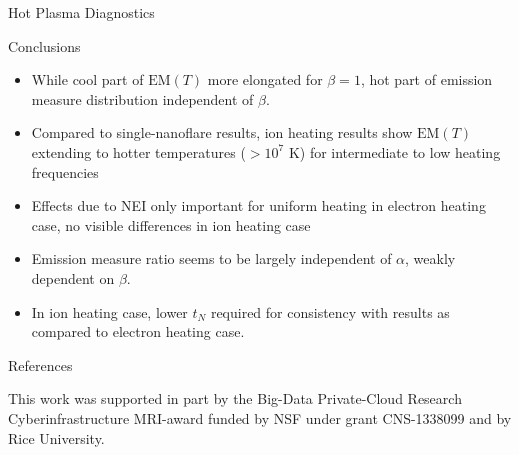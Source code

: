 \documentclass[final]{beamer}
\begin{document}
\begin{frame}
\begin{columns}[t]
\begin{column}{0.49\linewidth}
\begin{block}{Hot Plasma Diagnostics}
    \end{block}
    \begin{block}{Conclusions}
      \begin{itemize}
        \item While cool part of $\mathrm{EM}(T)$ more elongated for $\beta=1$, \alert{hot part of emission measure distribution independent of $\beta$}.
        \item Compared to single-nanoflare results, ion heating results show $\mathrm{EM}(T)$ extending to hotter temperatures ($>10^7$ K) for intermediate to low heating frequencies
        \item \alert{Effects due to NEI only important for uniform heating in electron heating case}, no visible differences in ion heating case
        \item Emission measure ratio seems to be largely independent of $\alpha$, weakly dependent on $\beta$.
        \item \alert{In ion heating case, lower $t_N$ required for consistency with \citet{brosius_pervasive_2014} results as compared to electron heating case}.
      \end{itemize}
    \end{block}
    \begin{block}{References}
      \scriptsize
      \vspace{-2ex}
      \begin{multicols}{2}
        
        
      \end{multicols}
      This work was supported in part by the Big-Data Private-Cloud Research Cyberinfrastructure MRI-award funded by NSF under grant CNS-1338099 and by Rice University.
    \end{block}
  \end{column}
  \end{columns}
\end{frame}
\end{document}
